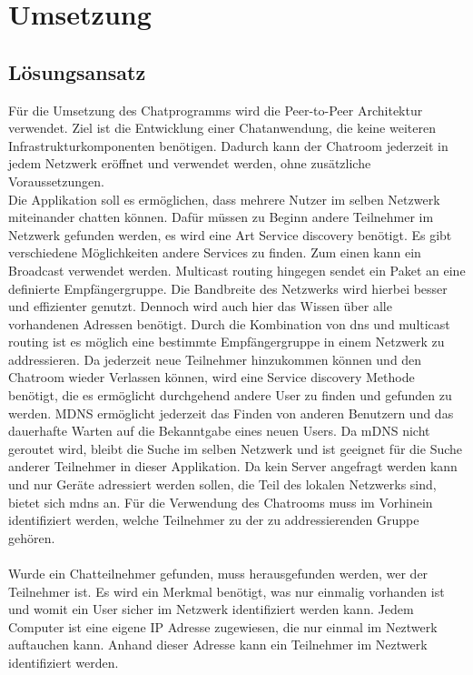 \section{Umsetzung}
\subsection{Lösungsansatz} 
Für die Umsetzung des Chatprogramms wird die Peer-to-Peer Architektur verwendet. 
Ziel ist die Entwicklung einer Chatanwendung, die keine weiteren Infrastrukturkomponenten benötigen.
Dadurch kann der Chatroom jederzeit in jedem Netzwerk eröffnet und verwendet werden, ohne zusätzliche Voraussetzungen. 
\\
Die Applikation soll es ermöglichen, dass mehrere Nutzer im selben Netzwerk miteinander chatten können. 
Dafür müssen zu Beginn andere Teilnehmer im Netzwerk gefunden werden, es wird eine Art Service discovery benötigt.
Es gibt verschiedene Möglichkeiten andere Services zu finden. 
Zum einen kann ein Broadcast verwendet werden.
Multicast routing hingegen sendet ein Paket an eine definierte Empfängergruppe. 
Die Bandbreite des Netzwerks wird hierbei besser und effizienter genutzt\cite[S. 382f]{tan10}.
Dennoch wird auch hier das Wissen über alle vorhandenen Adressen benötigt\cite[S. 381]{tan10}. 
Durch die Kombination von dns und multicast routing ist es möglich eine bestimmte Empfängergruppe in einem Netzwerk zu addressieren. 
Da jederzeit neue Teilnehmer hinzukommen können und den Chatroom wieder Verlassen können, wird eine Service discovery Methode benötigt, die es ermöglicht durchgehend andere User zu finden und gefunden zu werden.
MDNS ermöglicht jederzeit das Finden von anderen Benutzern und das dauerhafte Warten auf die Bekanntgabe eines neuen Users\cite[S. 611f]{tan10}. 
Da mDNS nicht geroutet wird, bleibt die Suche im selben Netzwerk und ist geeignet für die Suche anderer Teilnehmer in dieser Applikation.
Da kein Server angefragt werden kann und nur Geräte adressiert werden sollen, die Teil des lokalen Netzwerks sind, bietet sich mdns an\cite[S. 382]{tan10}. 
Für die Verwendung des Chatrooms muss im Vorhinein identifiziert werden, welche Teilnehmer zu der zu addressierenden Gruppe gehören. 
\\
\\
Wurde ein Chatteilnehmer gefunden, muss herausgefunden werden, wer der Teilnehmer ist. 
Es wird ein Merkmal benötigt, was nur einmalig vorhanden ist und womit ein User sicher im Netzwerk identifiziert werden kann. 
Jedem Computer ist eine eigene IP Adresse zugewiesen, die nur einmal im Neztwerk auftauchen kann. Anhand dieser Adresse kann ein Teilnehmer im Neztwerk identifiziert werden.
